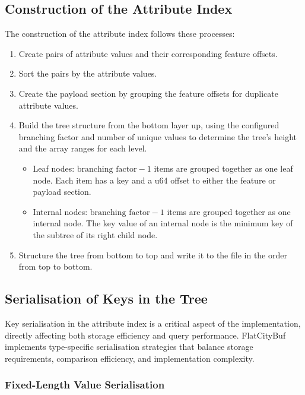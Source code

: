 \subsection{Construction of the Attribute Index}
\label{methodology:attribute_index:construction}

The construction of the attribute index follows these processes:

\begin{enumerate}
  \item Create pairs of attribute values and their corresponding feature offsets.
  \item Sort the pairs by the attribute values.
  \item Create the payload section by grouping the feature offsets for duplicate attribute values.
  \item Build the tree structure from the bottom layer up, using the configured branching factor and number of unique values to determine the tree's height and the array ranges for each level.
    \begin{itemize}
      \item Leaf nodes: $\text{branching factor} - 1$ items are grouped together as one leaf node. Each item has a key and a u64 offset to either the feature or payload section.
      \item Internal nodes: $\text{branching factor} - 1$ items are grouped together as one internal node. The key value of an internal node is the minimum key of the subtree of its right child node.
    \end{itemize}
  \item Structure the tree from bottom to top and write it to the file in the order from top to bottom.
\end{enumerate}

\subsection{Serialisation of Keys in the Tree}
\label{methodology:attribute_index:key_serialisation}

Key serialisation in the attribute index is a critical aspect of the implementation, directly affecting both storage efficiency and query performance. FlatCityBuf implements type-specific serialisation strategies that balance storage requirements, comparison efficiency, and implementation complexity.

\subsubsection{Fixed-Length Value Serialisation}
\label{methodology:attribute_index:fixed_length_serialisation}

